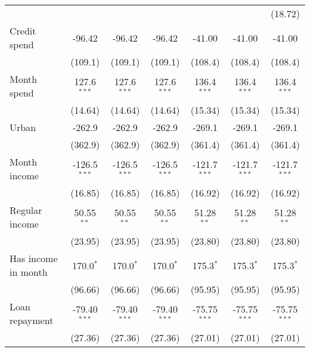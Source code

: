 \begin{table}[htbp]
\begin{threeparttable}[b]
\begin{tabular}{lcccccc}
                                   &                &                &                &                &                 & (18.72)\\   
         Credit spend              & -96.42         & -96.42         & -96.42         & -41.00         & -41.00          & -41.00\\   
                                   & (109.1)        & (109.1)        & (109.1)        & (108.4)        & (108.4)         & (108.4)\\   
         Month spend               & 127.6$^{***}$  & 127.6$^{***}$  & 127.6$^{***}$  & 136.4$^{***}$  & 136.4$^{***}$   & 136.4$^{***}$\\   
                                   & (14.64)        & (14.64)        & (14.64)        & (15.34)        & (15.34)         & (15.34)\\   
         Urban                     & -262.9         & -262.9         & -262.9         & -269.1         & -269.1          & -269.1\\   
                                   & (362.9)        & (362.9)        & (362.9)        & (361.4)        & (361.4)         & (361.4)\\   
         Month income              & -126.5$^{***}$ & -126.5$^{***}$ & -126.5$^{***}$ & -121.7$^{***}$ & -121.7$^{***}$  & -121.7$^{***}$\\   
                                   & (16.85)        & (16.85)        & (16.85)        & (16.92)        & (16.92)         & (16.92)\\   
         Regular income            & 50.55$^{**}$   & 50.55$^{**}$   & 50.55$^{**}$   & 51.28$^{**}$   & 51.28$^{**}$    & 51.28$^{**}$\\   
                                   & (23.95)        & (23.95)        & (23.95)        & (23.80)        & (23.80)         & (23.80)\\   
         Has income in month       & 170.0$^{*}$    & 170.0$^{*}$    & 170.0$^{*}$    & 175.3$^{*}$    & 175.3$^{*}$     & 175.3$^{*}$\\   
                                   & (96.66)        & (96.66)        & (96.66)        & (95.95)        & (95.95)         & (95.95)\\   
         Loan repayment            & -79.40$^{***}$ & -79.40$^{***}$ & -79.40$^{***}$ & -75.75$^{***}$ & -75.75$^{***}$  & -75.75$^{***}$\\   
                                   & (27.36)        & (27.36)        & (27.36)        & (27.01)        & (27.01)         & (27.01)\\   

\end{tabular}
\end{threeparttable}
\end{table}
